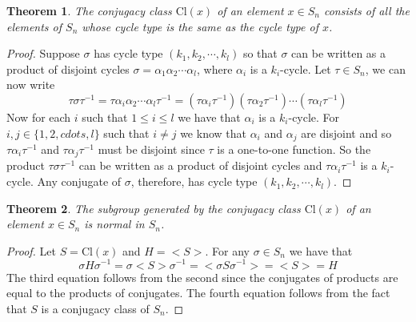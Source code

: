 \documentclass[a4paper,10pt]{article}
\newtheorem{theorem}{Theorem}
\begin{document}
\begin{theorem}
The conjugacy class $\textrm{Cl}(x)$ of an element $x \in S_n$ consists of all the elements of $S_n$ whose cycle type is the same as the cycle type of $x$.  
\end{theorem}

\begin{proof}
Suppose $\sigma$ has cycle type $(k_1,k_2,\cdots,k_l)$ so that $\sigma$ can be written as a product of disjoint cycles $\sigma = \alpha_1\alpha_2\cdots \alpha_l$, where $\alpha_i$ is a $k_i$-cycle. Let $\tau\in S_n$, we can now write
\begin{equation}
\tau \sigma \tau^{-1} = \tau \alpha_i\alpha_2\cdots\alpha_l\tau^{-1}=(\tau \alpha_i\tau^{-1})(\tau\alpha_2\tau^{-1})\cdots(\tau\alpha_l\tau^{-1}) 
\end{equation}
Now for each $i$ such that $1\leq i\leq l$ we have that $\alpha_i$ is a $k_i$-cycle. For $i,j\in\{1,2,cdots,l\}$
such that $i\neq j$ we know that $\alpha_i$ and $\alpha_j$ are disjoint and so $\tau\alpha_i\tau^{-1}$ and $\tau\alpha_j\tau^{-1}$ must be disjoint since $\tau$ is a one-to-one function. So the product $\tau\sigma\tau^{-1}$ can be written as a product of disjoint cycles and $\tau\alpha_i\tau^{-1}$ is a $k_i$-cycle. Any conjugate of $\sigma$, therefore, has cycle type $(k_1,k_2,\cdots,k_l)$.  
\end{proof}

\begin{theorem}
The subgroup generated by the conjugacy class $\textrm{Cl}(x)$ of an element $x \in S_n$ is normal in $S_n$.   
\end{theorem}
\begin{proof}
Let $S = \textrm{Cl}(x)$ and $H = <S>$. For any $\sigma\in S_n$ we have that
\begin{equation}
\sigma H \sigma^{-1} = \sigma <S> \sigma^{-1} = <\sigma S \sigma^{-1}> = <S> = H 
\end{equation}
The third equation follows from the second since the conjugates of products are equal to the products of conjugates. The fourth equation follows from the fact that $S$ is a conjugacy class of $S_n$.
\end{proof}
\end{document}

